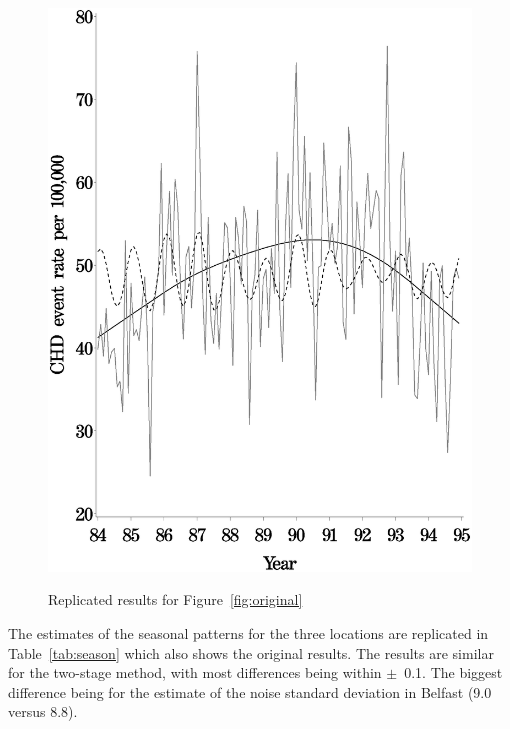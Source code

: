 \begin{figure}[!h]
{    \includegraphics[scale=0.2]{figures/estimates_combined_warsaw.eps}
    }

\caption{Replicated results for Figure~\ref{fig:original}}
	\label{fig}
\end{figure}

The estimates of the seasonal patterns for the three locations are replicated in Table~\ref{tab:season} which also shows the original results. The results are similar for the two-stage method, with most differences being within $\pm$~0.1. The biggest difference being for the estimate of the noise standard deviation in Belfast (9.0 versus 8.8).

